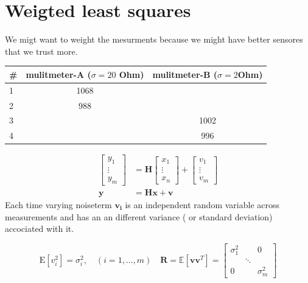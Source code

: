 \documentclass{article}
\begin{document}
\section*{Weigted least squares}
We migt want to weight the mesurments because we 
might have better sensores that we trust more.


\begin{table}[!h]
\centering
\begin{tabular}{| l | c | c | }
\hline
\# & mulitmeter-A  ($\sigma=20$ Ohm) & mulitmeter-B  ($\sigma=2$Ohm) \\
\hline
1         & 1068 &       \\
2         & 988  &      \\
3         & &   1002      \\
4         & &     996 \\   
\hline
\end{tabular}
\end{table}



\begin{equation}
\begin{aligned}\left[\begin{array}{l}{y_{1}} \\ {\vdots} \\ {y_{m}}\end{array}\right] &=\mathbf{H}\left[\begin{array}{c}{x_{1}} \\ {\vdots} \\ {x_{n}}\end{array}\right]+\left[\begin{array}{c}{v_{1}} \\ {\vdots} \\ {v_{m}}\end{array}\right] \\ \mathbf{y} &=\mathbf{H x}+\mathbf{v} \end{aligned}
\end{equation}
Each time varying noiseterm $\mathbf{v_i}$ is an independent random variable across
 measurements and has an  an different  variance ( or standard deviation)
 accociated with it.



\begin{equation}
\mathrm{E}\left[v_{i}^{2}\right]=\sigma_{i}^{2}, \quad(i=1, \ldots, m) \quad \mathbf{R}=\mathbb{E}\left[\mathbf{v} \mathbf{v}^{T}\right]=\left[\begin{array}{ccc}{\sigma_{1}^{2}} & {} & {0} \\ {} & {\ddots} & {} \\ {0} & {} & {\sigma_{m}^{2}}\end{array}\right]
\end{equation}
\end{document}
